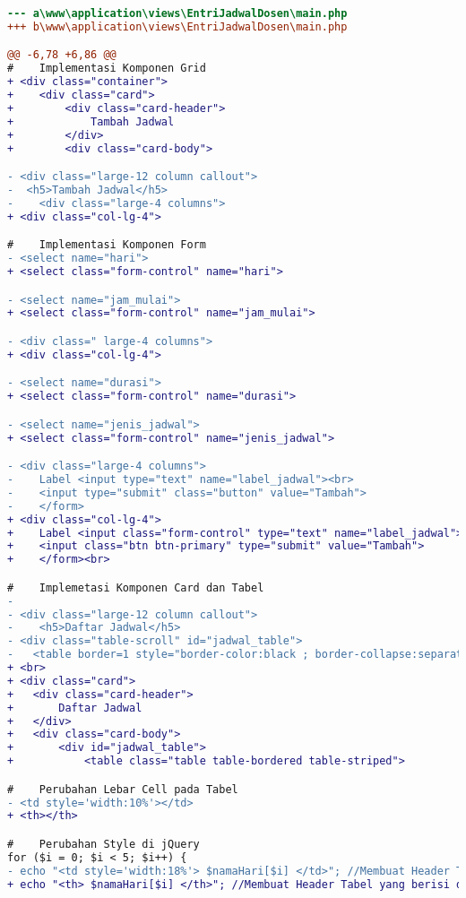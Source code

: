 \begin{lstlisting}[language=diff, caption=Kode untuk Halaman Entri Jadwal Dosen,  basicstyle=\ttfamily, frame=single,
columns=fullflexible, keepspaces=true, breaklines=true, label={lst:mainEntriJadwalDosen}]
--- a\www\application\views\EntriJadwalDosen\main.php
+++ b\www\application\views\EntriJadwalDosen\main.php

@@ -6,78 +6,86 @@
#    Implementasi Komponen Grid
+ <div class="container">
+    <div class="card">
+        <div class="card-header">
+            Tambah Jadwal
+        </div>
+        <div class="card-body">

- <div class="large-12 column callout">
-  <h5>Tambah Jadwal</h5>
-    <div class="large-4 columns">
+ <div class="col-lg-4">

#    Implementasi Komponen Form
- <select name="hari"> 
+ <select class="form-control" name="hari">

- <select name="jam_mulai"> 
+ <select class="form-control" name="jam_mulai">

- <div class=" large-4 columns">
+ <div class="col-lg-4">

- <select name="durasi"> 
+ <select class="form-control" name="durasi">

- <select name="jenis_jadwal"> 
+ <select class="form-control" name="jenis_jadwal">

- <div class="large-4 columns">
-    Label <input type="text" name="label_jadwal"><br>
-    <input type="submit" class="button" value="Tambah">
-    </form>
+ <div class="col-lg-4">
+    Label <input class="form-control" type="text" name="label_jadwal"><br><br>
+    <input class="btn btn-primary" type="submit" value="Tambah">
+    </form><br>

#    Implemetasi Komponen Card dan Tabel
-
- <div class="large-12 column callout">
-    <h5>Daftar Jadwal</h5>
- <div class="table-scroll" id="jadwal_table">
-	<table border=1 style="border-color:black ; border-collapse:separate">
+ <br>
+ <div class="card">
+ 	<div class="card-header">
+    	Daftar Jadwal
+ 	</div>
+ 	<div class="card-body">
+   	<div id="jadwal_table">
+        	<table class="table table-bordered table-striped">

#    Perubahan Lebar Cell pada Tabel
- <td style='width:10%'></td>
+ <th></th>

#    Perubahan Style di jQuery
for ($i = 0; $i < 5; $i++) {
- echo "<td style='width:18%'> $namaHari[$i] </td>"; //Membuat Header Tabel yang berisi daftar hari
+ echo "<th> $namaHari[$i] </th>"; //Membuat Header Tabel yang berisi daftar hari


\end{lstlisting}
